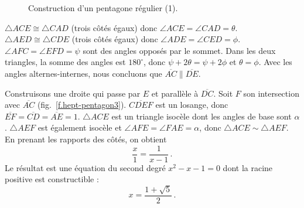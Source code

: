 \begin{figure}[htbp]
\centering

\caption{Construction d'un pentagone régulier 
 (1).}\label{f.hept-pentagon2}
\end{figure}
$\triangle ACE\cong \triangle CAD$ (trois côtés égaux) donc $\angle ACE=\angle CAD=\theta$. $\triangle AED\cong\triangle CDE$  (trois côtés égaux) donc  $\angle ADE=\angle CED=\phi$. $\angle AFC=\angle EFD=\psi$ sont des angles opposés par le sommet. Dans les deux triangles, la somme des angles est  $180^\circ$, donc
$\psi+2\theta=\psi+ 2\phi$ et $\theta=\phi$.
Avec les angles alternes-internes, nous concluons que $\overline{AC}\parallel \overline{DE}$.

Construisons une droite qui passe  par $E$ et parallèle à $\overline{DC}$. Soit $F$ son intersection avec $\overline{AC}$ (fig.~\ref{f.hept-pentagon3}). $\overline{CDEF}$ est un losange,  donc $\overline{EF}=\overline{CD}=\overline{AE}=1$. $\triangle ACE$ est un triangle isocèle dont les angles de base sont $\alpha$. $\triangle AEF$ est également isocèle et $\angle AFE=\angle FAE=\alpha$, donc $\triangle ACE\sim \triangle AEF$. En prenant les rapports des côtés, on obtient
\[
\frac{x}{1}=\frac{1}{x-1}\,.
\]
Le résultat est une équation du second degré $x^2-x-1=0$ 
dont la racine positive est constructible :
\[
x=\frac{1+\sqrt{5}}{2}\,.
\]

